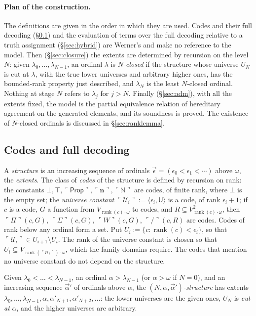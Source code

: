 \documentclass[10pt]{article}
\newcommand{\N}{\mathbb{N}}
\newcommand{\Prop}{\mathsf{Prop}}
\newcommand{\rk}{\operatorname{rank}}
\newcommand{\code}[1]{\ulcorner #1\urcorner}
\newcommand{\U}{\mathcal{U}}
\begin{document}
\paragraph{Plan of the construction.}
The definitions are given in the order in which they are used. Codes and
their full decoding (\S\ref{sec:codes}) and the evaluation of terms over
the full decoding relative to a truth assignment (\S\ref{sec:hybrid})
are Werner's and make no reference to the model. Then
(\S\ref{sec:closure}) the extents are determined by recursion on the
level $N$: given $\lambda_0,\dots,\lambda_{N-1}$, an ordinal $\lambda$ is
\emph{$N$-closed} if the structure whose universe $U_N$ is cut at
$\lambda$, with the true lower universes and arbitrary higher ones, has
the bounded-rank property just described, and $\lambda_N$ is the least
$N$-closed ordinal. Nothing at stage $N$ refers to $\lambda_j$ for
$j>N$. Finally (\S\ref{sec:adm}), with all the extents fixed, the model
is the partial equivalence relation of hereditary agreement on the
generated elements, and its soundness is proved. The existence of
$N$-closed ordinals is discussed in \S\ref{sec:ranklemma}.

\subsection{Codes and full decoding}\label{sec:codes}

\begin{definition}\label{def:codes2}
A \emph{structure} is an increasing sequence of ordinals
$\vec\epsilon=(\epsilon_0<\epsilon_1<\cdots)$ above $\omega$, the
\emph{extents}. The class of \emph{codes} of the structure is defined by
recursion on rank: the constants
$\bot,\top,\code\Prop,\code{\mathbf n},\code\N$ are codes, of finite
rank, where $\bot$ is the empty set; the \emph{universe constant}
$\code{\U_i}:=\langle\epsilon_i,\mathsf U\rangle$ is a code, of rank
$\epsilon_i+1$; if $c$ is a code, $G$ a function from
$V_{\rk(c)\cdot\omega}$ to codes, and $R\subseteq V_{\rk(c)\cdot\omega}^2$,
then $\code\Pi(c,G)$, $\code\Sigma(c,G)$, $\code W(c,G)$, $\code/(c,R)$
are codes. Codes of rank below any ordinal form a set. Put
$U_i:=\{c:\rk(c)<\epsilon_i\}$, so that
$\code{\U_i}\in U_{i+1}\setminus U_i$. The rank of the universe constant
is chosen so that $U_i\subseteq V_{\rk(\code{\U_i})\cdot\omega}$, which
the family domains require. The codes that mention no universe constant
do not depend on the structure.

Given $\lambda_0<\dots<\lambda_{N-1}$, an ordinal $\alpha>\lambda_{N-1}$
(or $\alpha>\omega$ if $N=0$), and an increasing sequence $\vec\alpha'$
of ordinals above $\alpha$, the \emph{$(N,\alpha,\vec\alpha')$-structure}
has extents $\lambda_0,\dots,\lambda_{N-1},\alpha,\alpha'_{N+1},\alpha'_{N+2},\dots$:
the lower universes are the given ones, $U_N$ is \emph{cut at} $\alpha$,
and the higher universes are arbitrary.
\end{definition}
\end{document}
